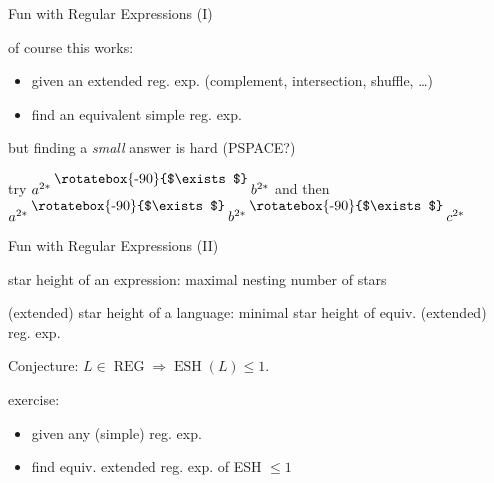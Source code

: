 \begin{slide}{Fun with Regular Expressions (I)}

of course this works:
\begin{itemize}
\item given an extended reg. exp.
  (complement, intersection, shuffle, \dots)
\item find an equivalent simple reg. exp.
\end{itemize}
but finding a \emph{small} answer is hard (PSPACE?)

\newcommand{\shuffle}{\mathbin{\raisebox{8pt}{\rotatebox{-90}{$\exists$}}}}

try $a^{2*} \shuffle b^{2*}$ and then $a^{2*} \shuffle b^{2*} \shuffle c^{2*}$ 

\end{slide}

\begin{slide}{Fun with Regular Expressions (II)}

star height of an expression: maximal nesting number of stars

(extended) star height of a language: 
minimal star height of equiv. (extended) reg. exp.

\newcommand{\REG}{\operatorname{REG}}
\newcommand{\ESH}{\operatorname{ESH}}
Conjecture: $L\in\REG \Rightarrow \ESH(L)\le 1$.

exercise:
\begin{itemize}
\item given any (simple) reg. exp.
\item find equiv. extended reg. exp. of ESH $\le 1$
\end{itemize}

\end{slide}
